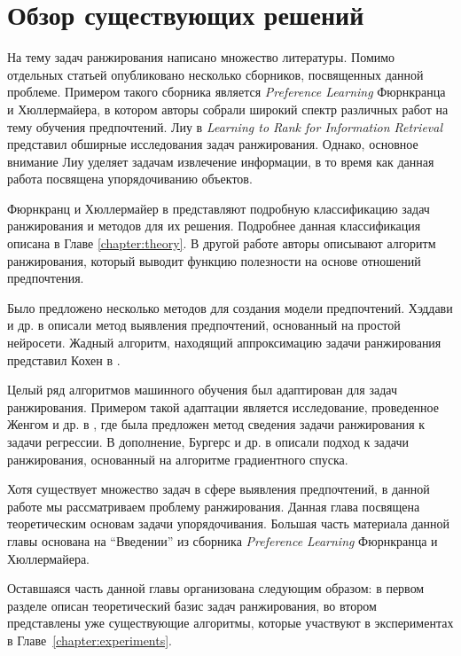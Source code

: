 \chapter{Обзор существующих решений}
\label{chapter:literature}

На тему задач ранжирования написано множество литературы. Помимо отдельных статьей опубликовано несколько сборников, посвященных данной проблеме. Примером такого сборника является \textit{Preference Learning} \cite{plbook:2010} Фюрнкранца и Хюллермайера, в котором авторы собрали широкий спектр различных работ на тему обучения предпочтений. Лиу в \textit{Learning to Rank for Information Retrieval} \cite{Liu:2011} представил обширные исследования задач ранжирования. Однако, основное внимание Лиу уделяет задачам извлечение информации, в то время как данная работа посвящена упорядочиванию объектов.

Фюрнкранц и Хюллермайер в \cite{plbook:Introduction:2010} представляют подробную классификацию задач ранжирования и методов для их решения. Подробнее данная классификация описана в Главе \ref{chapter:theory}. В другой работе \cite{Furnkranz:2003} авторы описывают алгоритм ранжирования, который выводит функцию полезности на основе отношений предпочтения.

Было предложено несколько методов для создания модели предпочтений. Хэддави и др. в \cite{Haddawy:2003} описали метод выявления предпочтений, основанный на простой нейросети. Жадный алгоритм, находящий аппроксимацию задачи ранжирования представил Кохен в \cite{Cohen:1999}.

Целый ряд алгоритмов машинного обучения был адаптирован для задач ранжирования. Примером такой адаптации является исследование, проведенное Женгом и др. в \cite{Zheng:2007}, где была предложен метод сведения задачи ранжирования к задачи регрессии. В дополнение, Бургерс и др. в \cite{Burges:2005} описали подход к задачи ранжирования, основанный на алгоритме градиентного спуска.

Хотя существует множество задач в сфере выявления предпочтений, в данной работе мы рассматриваем проблему ранжирования. Данная глава посвящена теоретическим основам задачи упорядочивания. Большая часть материала данной главы основана на \enquote{Введении} из сборника \textit{Preference Learning} Фюрнкранца и Хюллермайера\cite{plbook:Introduction:2010}.

Оставшаяся часть данной главы организована следующим образом: в первом разделе описан теоретический базис задач ранжирования, во втором представлены уже существующие алгоритмы, которые участвуют в экспериментах в Главе~\ref{chapter:experiments}.

